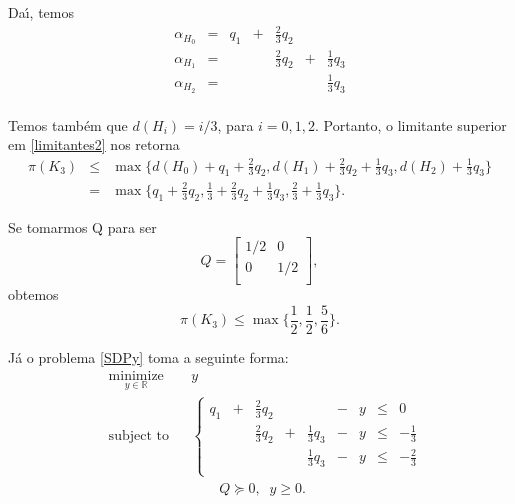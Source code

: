 \documentclass{amsart}
\theoremstyle{theorem}
\theoremstyle{definition}
\theoremstyle{remark}
\numberwithin{equation}{section}
\begin{document}
Da\'{\i}, temos
\begin{equation}
   \begin{array}{rcccccc}
     \alpha_{H_0} & = & q_1 &+& \frac{2}{3}q_2 & & \\
     \alpha_{H_1} & = & & &\frac{2}{3}q_2 &+& \frac{1}{3}q_3 \\
     \alpha_{H_2} & = & & & & &\frac{1}{3}q_3\\
   \end{array}
\end{equation}

Temos tamb\'{e}m que $d(H_i) = i/3$, para $i = 0,1,2$. Portanto, o limitante superior em \ref{limitantes2} nos retorna
\begin{equation*}
\begin{array}{rcl}
     \pi(K_3) &\leq& \displaystyle{ \max \{d(H_0)  +  q_1 + \frac{2}{3}q_2, d(H_1) + \frac{2}{3}q_2 + \frac{1}{3}q_3, d(H_2) + \frac{1}{3}q_3 \}} \\
    &=& \displaystyle{ \max\{q_1 + \frac{2}{3}q_2, \frac{1}{3} + \frac{2}{3}q_2 + \frac{1}{3}q_3 ,\frac{2}{3} + \frac{1}{3}q_3 \} }.
\end{array}
\end{equation*}

Se tomarmos Q para ser
\begin{equation*}
Q = \left[
  \begin{array}{cc}
    1/2 & 0 \\
    0 & 1/2 \\
  \end{array}
\right],
\end{equation*}
obtemos
\begin{equation*}
     \pi(K_3) \leq \displaystyle{ \max\{\frac{1}{2}, \frac{1}{2} ,\frac{5}{6} \} }.
\end{equation*}

J\'{a} o problema \ref{SDPy} toma a seguinte forma:
\begin{equation}\label{SDPmantel}
\begin{aligned}
& \underset{y \in\mathbb{R}}{\text{minimize}} & & y \\
& \text{subject to} & & {\left\{\begin{array}{ccccccccc}
                           q_1  &+& \frac{2}{3}q_2  & &                 &-& y & \leq & 0 \\
                                & & \frac{2}{3}q_2  &+& \frac{1}{3}q_3  &-& y & \leq & -\frac{1}{3} \\
                                & &                 & & \frac{1}{3}q_3  &-& y & \leq & -\frac{2}{3} \\
                         \end{array}\right.
} \\
&&& \quad\quad Q \succeq 0,\;\;y \geq 0.
\end{aligned}
\end{equation}
\end{document}
